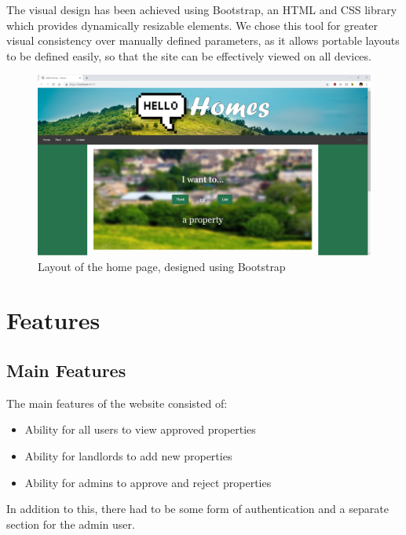 \documentclass{article}
\begin{document}
    \par
        The visual design has been achieved using Bootstrap, an HTML and CSS library which provides dynamically resizable elements.
        We chose this tool for greater visual consistency over manually defined parameters, as it allows portable layouts to be defined easily, so that the site can be effectively viewed on all devices.

        \begin{figure}[ht]
            \centering
            \includegraphics[width=\textwidth]{figures/index_page.png}
            \caption[Home page layout]{Layout of the home page, designed using Bootstrap}
            \label{fig:index_page}
        \end{figure}

\section{Features}
    \subsection{Main Features}
        \par
            The main features of the website consisted of:
            \begin{itemize}
                \item Ability for all users to view approved properties
                \item Ability for landlords to add new properties
                \item Ability for admins to approve and reject properties
            \end{itemize}

        \par
            In addition to this, there had to be some form of authentication and a separate section for the admin user.
\end{document}
